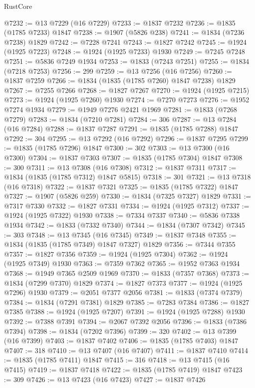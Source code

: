 \begin{lexlean}{RustCore}
\begin{coremodule}
@7232 := @13 @7229 (@16 @7229)
@7233 := @1837 @7232
@7236 := @1835 (@1785 @7233) @1847
@7238 := @1907 (@5826 @238)
@7241 := @1834 (@7236 @7238) @1829
@7242 := @7228 @7241
@7243 := @1827 @7242
@7245 := @1924 (@1925 @7223)
@7248 := @1924 (@1925 @7233) @1930
@7249 := @7245 @7248
@7251 := @5836 @7249 @1934
@7253 := @1833 (@7243 @7251)
@7255 := @1834 (@7218 @7253)
@7256 := 299
@7259 := @13 @7256 (@16 @7256)
@7260 := @1837 @7259
@7266 := @1834 (@1835 (@1785 @7260) @1847 @7238) @1829
@7267 := @7255 @7266
@7268 := @1827 @7267
@7270 := @1924 (@1925 @7215)
@7273 := @1924 (@1925 @7260) @1930
@7274 := @7270 @7273
@7276 := @1952 @7274 @1934
@7279 := @1949 @7276 @2421 @1969
@7281 := @1833 (@7268 @7279)
@7283 := @1834 (@7210 @7281)
@7284 := 306
@7287 := @13 @7284 (@16 @7284)
@7288 := @1837 @7287
@7291 := @1835 (@1785 @7288) @1847
@7292 := 304
@7295 := @13 @7292 (@16 @7292)
@7296 := @1837 @7295
@7299 := @1835 (@1785 @7296) @1847
@7300 := 302
@7303 := @13 @7300 (@16 @7300)
@7304 := @1837 @7303
@7307 := @1835 (@1785 @7304) @1847
@7308 := 300
@7311 := @13 @7308 (@16 @7308)
@7312 := @1837 @7311
@7317 := @1834 (@1835 (@1785 @7312) @1847 @5815)
@7318 := 301
@7321 := @13 @7318 (@16 @7318)
@7322 := @1837 @7321
@7325 := @1835 (@1785 @7322) @1847
@7327 := @1907 (@5826 @259)
@7330 := @1834 (@7325 @7327) @1829
@7331 := @7317 @7330
@7332 := @1827 @7331
@7334 := @1924 (@1925 @7312)
@7337 := @1924 (@1925 @7322) @1930
@7338 := @7334 @7337
@7340 := @5836 @7338 @1934
@7342 := @1833 (@7332 @7340)
@7344 := @1834 (@7307 @7342)
@7345 := 303
@7348 := @13 @7345 (@16 @7345)
@7349 := @1837 @7348
@7355 := @1834 (@1835 (@1785 @7349) @1847 @7327) @1829
@7356 := @7344 @7355
@7357 := @1827 @7356
@7359 := @1924 (@1925 @7304)
@7362 := @1924 (@1925 @7349) @1930
@7363 := @7359 @7362
@7365 := @1952 @7363 @1934
@7368 := @1949 @7365 @2509 @1969
@7370 := @1833 (@7357 @7368)
@7373 := @1834 (@7299 @7370) @1829
@7374 := @1827 @7373
@7377 := @1924 (@1925 @7296) @1930
@7379 := @2051 @7377 @2056
@7381 := @1833 (@7374 @7379)
@7384 := @1834 (@7291 @7381) @1829
@7385 := @7283 @7384
@7386 := @1827 @7385
@7388 := @1924 (@1925 @7207)
@7391 := @1924 (@1925 @7288) @1930
@7392 := @7388 @7391
@7394 := @2067 @7392 @2056
@7396 := @1833 (@7386 @7394)
@7398 := @1834 (@7202 @7396)
@7399 := 320
@7402 := @13 @7399 (@16 @7399)
@7403 := @1837 @7402
@7406 := @1835 (@1785 @7403) @1847
@7407 := 318
@7410 := @13 @7407 (@16 @7407)
@7411 := @1837 @7410
@7414 := @1835 (@1785 @7411) @1847
@7415 := 316
@7418 := @13 @7415 (@16 @7415)
@7419 := @1837 @7418
@7422 := @1835 (@1785 @7419) @1847
@7423 := 309
@7426 := @13 @7423 (@16 @7423)
@7427 := @1837 @7426

\end{coremodule}
\end{lexlean}
